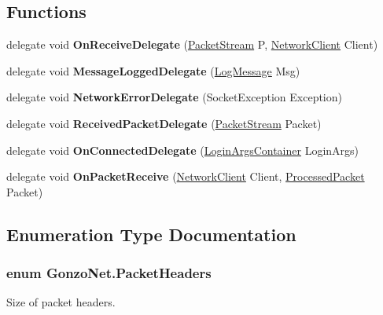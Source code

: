 \subsection*{Functions}
\begin{DoxyCompactItemize}
\item 
\hypertarget{namespace_gonzo_net_a80752e61c674cce309f5a0e6dd30cce9}{delegate void {\bfseries On\+Receive\+Delegate} (\hyperlink{class_gonzo_net_1_1_packet_stream}{Packet\+Stream} P, \hyperlink{class_gonzo_net_1_1_network_client}{Network\+Client} Client)}\label{namespace_gonzo_net_a80752e61c674cce309f5a0e6dd30cce9}

\item 
\hypertarget{namespace_gonzo_net_a629a6a0bd80e5069dddb63582f9a77c9}{delegate void {\bfseries Message\+Logged\+Delegate} (\hyperlink{class_gonzo_net_1_1_log_message}{Log\+Message} Msg)}\label{namespace_gonzo_net_a629a6a0bd80e5069dddb63582f9a77c9}

\item 
\hypertarget{namespace_gonzo_net_a3f10f12fae3658f43e3b7c637f149923}{delegate void {\bfseries Network\+Error\+Delegate} (Socket\+Exception Exception)}\label{namespace_gonzo_net_a3f10f12fae3658f43e3b7c637f149923}

\item 
\hypertarget{namespace_gonzo_net_a7b95abf8b062cd047ab2b66663e7d5f5}{delegate void {\bfseries Received\+Packet\+Delegate} (\hyperlink{class_gonzo_net_1_1_packet_stream}{Packet\+Stream} Packet)}\label{namespace_gonzo_net_a7b95abf8b062cd047ab2b66663e7d5f5}

\item 
\hypertarget{namespace_gonzo_net_a433ebf5b05f1d69158565139b4f0d27c}{delegate void {\bfseries On\+Connected\+Delegate} (\hyperlink{class_gonzo_net_1_1_login_args_container}{Login\+Args\+Container} Login\+Args)}\label{namespace_gonzo_net_a433ebf5b05f1d69158565139b4f0d27c}

\item 
\hypertarget{namespace_gonzo_net_a58d8b173f871c034118db268a668b3cf}{delegate void {\bfseries On\+Packet\+Receive} (\hyperlink{class_gonzo_net_1_1_network_client}{Network\+Client} Client, \hyperlink{class_gonzo_net_1_1_processed_packet}{Processed\+Packet} Packet)}\label{namespace_gonzo_net_a58d8b173f871c034118db268a668b3cf}

\end{DoxyCompactItemize}


\subsection{Enumeration Type Documentation}
\hypertarget{namespace_gonzo_net_a1a393df901137d5abf40b58a37edf1d6}{
\subsubsection[{Packet\+Headers}]{\setlength{\rightskip}{0pt plus 5cm}enum {\bf Gonzo\+Net.\+Packet\+Headers}}}\label{namespace_gonzo_net_a1a393df901137d5abf40b58a37edf1d6}


Size of packet headers. 

